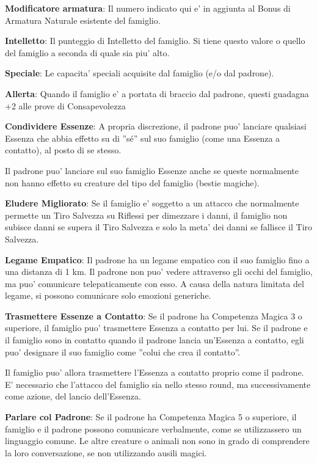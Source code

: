 \documentclass[a4paper,11pt,twoside,openany]{book}
\begin{document}
	\textbf{Modificatore armatura}: Il numero indicato qui e' in aggiunta al Bonus di Armatura Naturale esistente del famiglio.
	
	\textbf{Intelletto}: Il punteggio di Intelletto del famiglio. Si tiene questo valore o quello del famiglio a seconda di quale sia piu' alto. 
	
	\textbf{Speciale}: Le capacita' speciali acquisite dal famiglio (e/o dal padrone).
	
	\textbf{Allerta}: Quando il famiglio e' a portata di braccio dal padrone, questi guadagna +2 alle prove di Consapevolezza
	
	\textbf{Condividere Essenze}: A propria discrezione, il padrone puo' lanciare qualsiasi Essenza che abbia effetto su di ''sé'' sul suo famiglio (come una Essenza a contatto), al posto di se stesso.
	
	Il padrone puo' lanciare sul suo famiglio Essenze anche se queste normalmente non hanno effetto su creature del tipo del famiglio (bestie magiche).
	
	\textbf{Eludere Migliorato}: Se il famiglio e' soggetto a un attacco che normalmente permette un Tiro Salvezza su Riflessi per dimezzare i danni, il famiglio non subisce danni se supera il Tiro Salvezza e solo la meta' dei danni se fallisce il Tiro Salvezza.
	
	\textbf{Legame Empatico}: Il padrone ha un legame empatico con il suo famiglio fino a una distanza di 1 km. Il padrone non puo' vedere attraverso gli occhi del famiglio, ma puo' comunicare telepaticamente con esso. A causa della natura limitata del legame, si possono comunicare solo emozioni generiche.
	
	\textbf{Trasmettere Essenze a Contatto}: Se il padrone ha Competenza Magica 3 o superiore, il famiglio puo' trasmettere Essenza a contatto per lui. Se il padrone e il famiglio sono in contatto quando il padrone lancia un'Essenza a contatto, egli puo' designare il suo famiglio come ''colui che crea il contatto''.
	
	Il famiglio puo' allora trasmettere l'Essenza a contatto proprio come il padrone. E' necessario che l'attacco del famiglio sia nello stesso round, ma successivamente come azione, del lancio dell'Essenza.
	
	\textbf{Parlare col Padrone}: Se il padrone ha Competenza Magica 5 o superiore, il famiglio e il padrone possono comunicare verbalmente, come se utilizzassero un linguaggio comune. Le altre creature o animali non sono in grado di comprendere la loro conversazione, se non utilizzando ausili magici.
	
\end{document}
